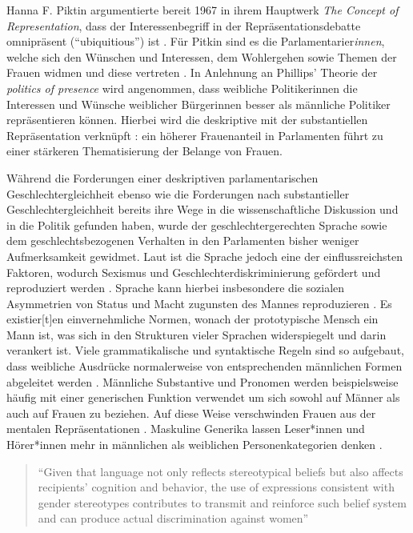 \documentclass[12pt, 
    twoside=false, 
    bibliography=totoc, 
    numbers=endperiod, 
    headings=normal, 
    toc=chapterentrydotfill
    ]{scrbook}
\begin{document}
Hanna F. Piktin \parencite*{pitkin_1972} argumentierte bereit 1967 in ihrem Hauptwerk \emph{The Concept of Representation}, dass der Interessenbegriff in der Repräsentationsdebatte omnipräsent (\enquote{ubiquitious}) ist \parencite[69]{wangnerud_2000}. Für Pitkin sind es die Parlamentarier\emph{innen}, welche sich den Wünschen und Interessen, dem Wohlergehen sowie Themen der Frauen widmen und diese vertreten \parencites[vgl.][413]{blaxill_2016}{pitkin_1972}. In Anlehnung an Phillips' Theorie der \emph{politics of presence} \parencite*{phillips_1998} wird angenommen, dass weibliche Politikerinnen die Interessen und Wünsche weiblicher Bürgerinnen besser als männliche Politiker repräsentieren können. Hierbei wird die deskriptive mit der substantiellen Repräsentation verknüpft \parencite[52]{wangnerud_2009}: ein höherer Frauenanteil in Parlamenten führt zu einer stärkeren Thematisierung der Belange von Frauen.

Während die Forderungen einer deskriptiven parlamentarischen Geschlechtergleichheit ebenso wie die Forderungen nach substantieller Geschlechtergleichheit bereits ihre Wege in die wissenschaftliche Diskussion und in die Politik gefunden haben, wurde der geschlechtergerechten Sprache sowie dem geschlechtsbezogenen Verhalten in den Parlamenten bisher weniger Aufmerksamkeit gewidmet. 
Laut \textcite{menegatti_2017} ist die Sprache jedoch eine der einflussreichsten Faktoren, wodurch Sexismus und Geschlechterdiskriminierung gefördert und reproduziert werden \parencite*[1]{menegatti_2017}. Sprache kann hierbei insbesondere die sozialen Asymmetrien von Status und Macht zugunsten des Mannes reproduzieren \parencite[1]{menegatti_2017}. Es existier[t]en einvernehmliche Normen, wonach der prototypische Mensch ein Mann ist, was sich in den Strukturen vieler Sprachen widerspiegelt und darin verankert ist. Viele grammatikalische und syntaktische Regeln sind so aufgebaut, dass weibliche Ausdrücke normalerweise von entsprechenden männlichen Formen abgeleitet werden \parencite*[1]{menegatti_2017}. Männliche Substantive und Pronomen werden beispielsweise häufig mit einer generischen Funktion verwendet um sich sowohl auf Männer als auch auf Frauen zu beziehen. Auf diese Weise verschwinden Frauen aus der mentalen Repräsentationen \parencites{vaughan_2018}{stahlberg_2001}. Maskuline Generika lassen Leser*innen und Hörer*innen mehr in männlichen als weiblichen Personenkategorien denken \parencites[2]{sczesny_2016}{stahlberg_2007}.

\citereset
\begin{quote}
    \enquote{Given that language not only reflects stereotypical beliefs but also affects recipients’ cognition and behavior, the use of expressions consistent with gender stereotypes contributes to transmit and reinforce such belief system and can produce actual discrimination against women} \parencite[2]{menegatti_2017}
\end{quote}
\end{document}
